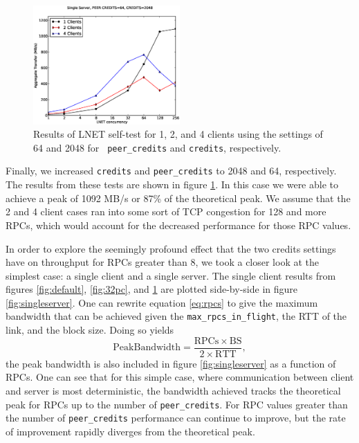 \documentclass[]{sigplan-proc}
\begin{document}
\begin{figure}
\centering
\includegraphics[width=0.50\textwidth]{figures/64pc_plot.eps}
\caption{Results of LNET self-test for 1, 2, and 4 clients using the settings of 64 and 2048 for {\tt
    peer\_credits} and {\tt credits}, respectively.}
\label{fig:64pc}
\end{figure}

Finally, we increased {\tt credits} and {\tt peer\_credits} to 2048 and 64, respectively. The results from
these tests are shown in figure \ref{fig:64pc}. In this case we were able to achieve a peak of 1092 MB/s or
87\% of the theoretical peak. We assume that the 2 and 4 client cases ran into some sort of TCP congestion for
128 and more RPCs, which would account for the decreased performance for those RPC values.

In order to explore the seemingly profound effect that the two credits settings have on throughput for RPCs
greater than 8, we took a closer look at the simplest case: a single client and a single server. The single
client results from figures \ref{fig:default}, \ref{fig:32pc}, and \ref{fig:64pc} are plotted side-by-side in
figure \ref{fig:singleserver}. One can rewrite equation \ref{eq:rpcs} to give the maximum bandwidth that can
be achieved given the {\tt max\_rpcs\_in\_flight}, the RTT of the link, and the block size. Doing so yields
\begin{equation}
\mathrm{Peak Bandwidth = \frac{RPCs \times BS}{2 \times RTT}},
\label{eq:band}
\end{equation}
the peak bandwidth is also included in figure \ref{fig:singleserver} as a function of RPCs. One can see that
for this simple case, where communication between client and server is most deterministic, the bandwidth
achieved tracks the theoretical peak for RPCs up to the number of {\tt peer\_credits}. For RPC values greater
than the number of {\tt peer\_credits} performance can continue to improve, but the rate of improvement
rapidly diverges from the theoretical peak. 
\end{document}
